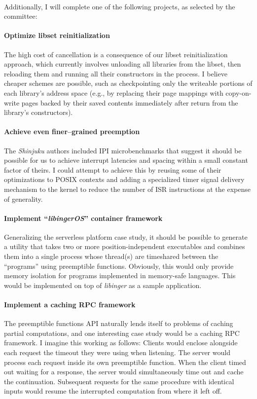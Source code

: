 \documentclass[12pt,letterpaper]{book}
\begin{document}
\hfill \\
\noindent
Additionally, I will complete one of the following projects, as selected by the
committee:

\paragraph{Optimize libset reinitialization}
The high cost of cancellation is a consequence of our libset reinitialization
approach, which currently involves unloading all libraries from the libset, then
reloading them and running all their constructors in the process.  I believe cheaper
schemes are possible, such as checkpointing only the writeable portions of each
library's address space (e.g., by replacing their page mappings with copy-on-write
pages backed by their saved contents immediately after return from the library's
constructors).

\paragraph{Achieve even finer--grained preemption}
The \textit{Shinjuku} authors included IPI microbenchmarks that suggest it should be
possible for us to achieve interrupt latencies and spacing within a small constant
factor of theirs.  I could attempt to achieve this by reusing some of their
optimizations to POSIX contexts and adding a specialized timer signal delivery
mechanism to the kernel to reduce the number of ISR instructions at the expense of
generality.

\paragraph{Implement ``\textit{libingerOS}'' container framework}
Generalizing the serverless platform case study, it should be possible to generate a
utility that takes two or more position-independent executables and combines them
into a single process whose thread(s) are timeshared between the ``programs'' using
preemptible functions.  Obviously, this would only provide memory isolation for
programs implemented in memory-safe languages.  This would be implemented on top of
\textit{libinger} as a sample application.

\paragraph{Implement a caching RPC framework}
The preemptible functions API naturally lends itself to problems of caching partial
computations, and one interesting case study would be a caching RPC framework.  I
imagine this working as follows:  Clients would enclose alongside each request the
timeout they were using when listening.  The server would process each request inside
its own preemptible function.  When the client timed out waiting for a response, the
server would simultaneously time out and cache the continuation.  Subsequent requests
for the same procedure with identical inputs would resume the interrupted computation
from where it left off.
\end{document}
